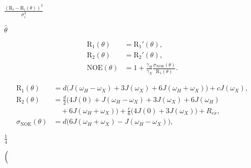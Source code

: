\documentclass[a4paper,11pt,twoside,openright]{book}
\def\lthtmlcheckvsize{\ifdim\ht\sizebox<\vsize 
  \ifdim\wd\sizebox<\hsize\expandafter\hfill\fi \expandafter\vfill
  \else\expandafter\vss\fi}%
\begin{document}
{\newpage\clearpage
{}%
$\displaystyle {\frac{{(\mathrm{R}_i- \mathrm{R}_i(\theta))^2}}{{\sigma_i^2}}}$%
\lthtmlindisplaymathZ
\lthtmlcheckvsize\clearpage}

{\newpage\clearpage
{}%
$ \hat{\theta}$%
\lthtmlindisplaymathZ
\lthtmlcheckvsize\clearpage}

{\newpage\clearpage
\setcounter{equation}{1}
%
\begin{subequations}\begin{align}
\mathrm{R}_1(\theta) &= \mathrm{R}_1'(\theta), \\
\mathrm{R}_2(\theta) &= \mathrm{R}_2'(\theta), \\
\mathrm{NOE}(\theta)  &= 1 + \frac{\gamma_{\scriptscriptstyle H}}{\gamma_{\scriptscriptstyle X}} \frac{\sigma_{\scriptscriptstyle \mathrm{NOE}}(\theta)}{\mathrm{R}_1(\theta)}.
\end{align}\end{subequations}%
\lthtmldisplayZ
\lthtmlcheckvsize\clearpage}

{\newpage\clearpage
\setcounter{equation}{2}
%
\begin{subequations}\begin{align}
\mathrm{R}_1(\theta) &= d \Big( J(\omega_H - \omega_X) + 3J(\omega_X) + 6J(\omega_H + \omega_X) \Big) + cJ(\omega_X),\\
\mathrm{R}_2(\theta) &= \frac{d}{2} \Big( 4J(0) + J(\omega_H - \omega_X) + 3J(\omega_X) + 6J(\omega_H)                     \\
& \quad + 6J(\omega_H + \omega_X) \Big) + \frac{c}{6} \Big( 4J(0) + 3J(\omega_X) \Big) + R_{ex},\\
\sigma_{\scriptscriptstyle \mathrm{NOE}}(\theta) &= d \Big( 6J(\omega_H + \omega_X) - J(\omega_H - \omega_X) \Big),\end{align}\end{subequations}%
\lthtmldisplayZ
\lthtmlcheckvsize\clearpage}

{\newpage\clearpage
{}%
$\displaystyle {\frac{{1}}{{4}}}$%
\lthtmlindisplaymathZ
\lthtmlcheckvsize\clearpage}

{\newpage\clearpage
{}%
$\displaystyle \left(\vphantom{\frac{\mu_0}{4\pi}}\right.$%
\lthtmlindisplaymathZ
\lthtmlcheckvsize\clearpage}
\end{document}
